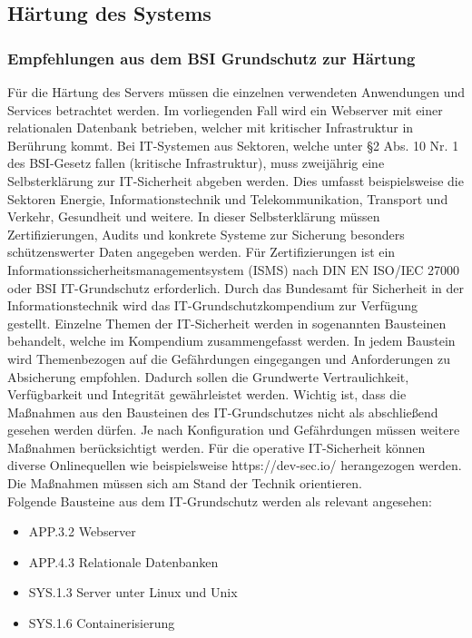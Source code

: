\newpage
\subsection{Härtung des Systems}\label{kap:haertung_des_systems}


\subsubsection{Empfehlungen aus dem BSI Grundschutz zur Härtung}

F\"ur die H\"artung des Servers m\"ussen die einzelnen verwendeten Anwendungen und Services betrachtet werden. Im vorliegenden Fall wird ein Webserver mit einer relationalen Datenbank betrieben, welcher mit kritischer Infrastruktur in Ber\"uhrung kommt. Bei IT-Systemen aus Sektoren, welche unter \S2 Abs. 10 Nr. 1 des BSI-Gesetz fallen (kritische Infrastruktur), muss zweij\"ahrig eine Selbsterkl\"arung zur IT-Sicherheit abgeben werden. Dies umfasst beispielsweise die Sektoren Energie, Informationstechnik und Telekommunikation, Transport und Verkehr, Gesundheit und weitere. In dieser Selbsterkl\"arung m\"ussen Zertifizierungen, Audits und konkrete Systeme zur Sicherung besonders sch\"utzenswerter Daten angegeben werden. F\"ur Zertifizierungen ist ein Informationssicherheitsmanagementsystem (ISMS) nach DIN EN ISO/IEC 27000 oder BSI IT-Grundschutz erforderlich. Durch das Bundesamt f\"ur Sicherheit in der Informationstechnik wird das IT-Grundschutzkompendium zur Verf\"ugung gestellt.  Einzelne Themen der IT-Sicherheit werden in sogenannten Bausteinen behandelt, welche im Kompendium zusammengefasst werden. In jedem Baustein wird Themenbezogen auf die Gef\"ahrdungen eingegangen und Anforderungen zu Absicherung empfohlen. Dadurch sollen die Grundwerte Vertraulichkeit, Verf\"ugbarkeit und Integrit\"at gew\"ahrleistet werden. Wichtig ist, dass die Ma{\ss}nahmen aus den Bausteinen des IT-Grundschutzes nicht als abschlie{\ss}end gesehen werden d\"urfen. Je nach Konfiguration und Gef\"ahrdungen m\"ussen weitere Ma{\ss}nahmen ber\"ucksichtigt werden. F\"ur die operative IT-Sicherheit k\"onnen diverse Onlinequellen wie beispielsweise https://dev-sec.io/ herangezogen werden. Die Ma{\ss}nahmen m\"ussen sich am Stand der Technik orientieren. \\

Folgende Bausteine aus dem IT-Grundschutz werden als relevant angesehen:
  \begin{itemize}
      \item APP.3.2 Webserver
			\item APP.4.3 Relationale Datenbanken
      \item SYS.1.3 Server unter Linux und Unix
			\item SYS.1.6 Containerisierung
   \end{itemize} 

